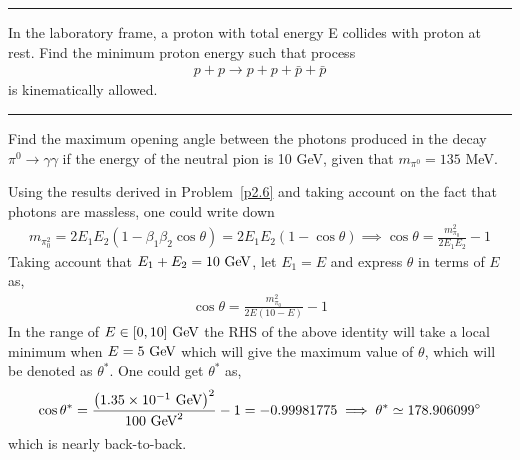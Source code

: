 \begin{solution}

\end{solution} 
\noindent\rule{7in}{1.5pt}



\begin{problem}{2.8}
    In the laboratory frame, a proton with total energy E collides with proton at rest. Find the minimum proton energy such that process
    \begin{align*}
        p+p \to p+p+\bar{p}+\bar{p}
    \end{align*}
    is kinematically allowed.
\end{problem}

\begin{solution}
        
\end{solution} 

\noindent\rule{7in}{1.5pt}


\begin{problem}{2.9}
Find the maximum opening angle between the photons produced in the decay $\pi^0\to\gamma\gamma$ if the energy of the neutral pion is 10 GeV, given that $m_{\pi^0}=135$ MeV.
\end{problem}

\begin{solution}
Using the results derived in Problem~\ref{p2.6} and taking account on the fact that photons are massless, one could write down 
\begin{align*}
    m_{\pi_0^2} = 2E_1E_2 \left( 1- \beta_1 \beta_2 \cos \theta \right) = 2E_1E_2 \left( 1- \cos\theta \right) \implies \cos \theta =  \frac{m_{\pi_0}^2}{2E_1E_2} - 1  
\end{align*}
Taking account that $E_1+E_2 = 10 \text{ GeV}$, let $E_1=E$ and express $\theta$ in terms of $E$ as,
\begin{align*}
    \cos \theta =  \frac{m_{\pi_0}^2}{2E(10-E)} - 1  
\end{align*}
In the range of $E\in[0,10]\text{ GeV}$ the RHS of the above identity will take a local minimum when $E=5\text{ GeV}$ which will give the maximum value of $\theta$, which will be denoted as $\theta^\ast$. One could get $\theta^\ast$ as,
\begin{align*}
    \cos \theta^\ast = \frac{\left( \num{1.35e-1}\text{ GeV} \right)^2}{100 \text{ GeV}^2} - 1 = -0.99981775 \implies \theta^\ast \simeq  178.906099^\circ
\end{align*}
which is nearly back-to-back.
\end{solution} 

